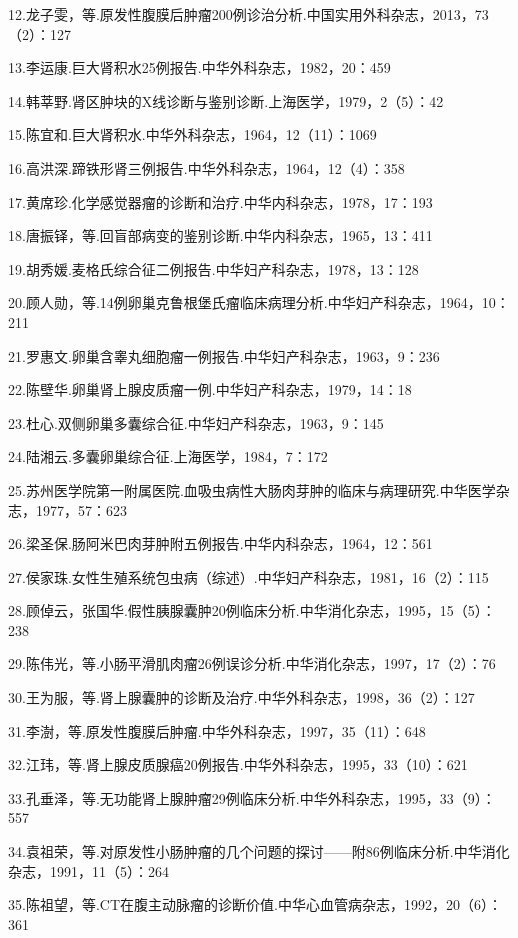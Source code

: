 12.龙子雯，等.原发性腹膜后肿瘤200例诊治分析.中国实用外科杂志，2013，73（2）：127

13.李运康.巨大肾积水25例报告.中华外科杂志，1982，20：459

14.韩莘野.肾区肿块的X线诊断与鉴别诊断.上海医学，1979，2（5）：42

15.陈宜和.巨大肾积水.中华外科杂志，1964，12（11）：1069

16.高洪深.蹄铁形肾三例报告.中华外科杂志，1964，12（4）：358

17.黄席珍.化学感觉器瘤的诊断和治疗.中华内科杂志，1978，17：193

18.唐振铎，等.回盲部病变的鉴别诊断.中华内科杂志，1965，13：411

19.胡秀媛.麦格氏综合征二例报告.中华妇产科杂志，1978，13：128

20.顾人勋，等.14例卵巢克鲁根堡氏瘤临床病理分析.中华妇产科杂志，1964，10：211

21.罗惠文.卵巢含睾丸细胞瘤一例报告.中华妇产科杂志，1963，9：236

22.陈壁华.卵巢肾上腺皮质瘤一例.中华妇产科杂志，1979，14：18

23.杜心.双侧卵巢多囊综合征.中华妇产科杂志，1963，9：145

24.陆湘云.多囊卵巢综合征.上海医学，1984，7：172

25.苏州医学院第一附属医院.血吸虫病性大肠肉芽肿的临床与病理研究.中华医学杂志，1977，57：623

26.梁圣保.肠阿米巴肉芽肿附五例报告.中华内科杂志，1964，12：561

27.侯家珠.女性生殖系统包虫病（综述）.中华妇产科杂志，1981，16（2）：115

28.顾倬云，张国华.假性胰腺囊肿20例临床分析.中华消化杂志，1995，15（5）：238

29.陈伟光，等.小肠平滑肌肉瘤26例误诊分析.中华消化杂志，1997，17（2）：76

30.王为服，等.肾上腺囊肿的诊断及治疗.中华外科杂志，1998，36（2）：127

31.李澍，等.原发性腹膜后肿瘤.中华外科杂志，1997，35（11）：648

32.江玮，等.肾上腺皮质腺癌20例报告.中华外科杂志，1995，33（10）：621

33.孔垂泽，等.无功能肾上腺肿瘤29例临床分析.中华外科杂志，1995，33（9）：557

34.袁祖荣，等.对原发性小肠肿瘤的几个问题的探讨------附86例临床分析.中华消化杂志，1991，11（5）：264

35.陈祖望，等.CT在腹主动脉瘤的诊断价值.中华心血管病杂志，1992，20（6）：361

